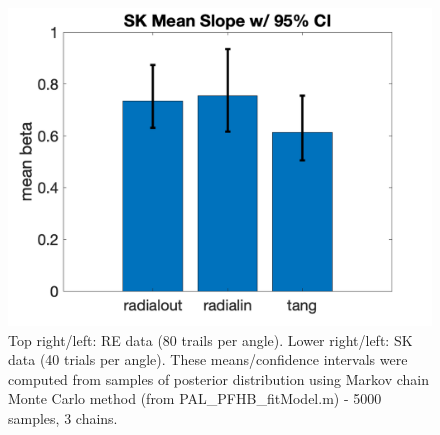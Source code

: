 \documentclass[11pt]{article} %
\begin{document}
\begin{figure}[H]
\includegraphics[scale=.2]{Images/MeanSlopeError_95ci_SK.png}
\caption{Top right/left: RE data (80 trails per angle). Lower right/left: SK data (40 trials per angle). These means/confidence intervals were computed from samples of posterior distribution using Markov chain Monte Carlo method (from PAL\_PFHB\_fitModel.m) - 5000 samples, 3 chains.}
\end{figure}
\end{document}
